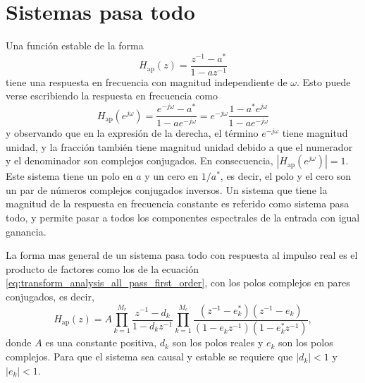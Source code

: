 \documentclass[a4paper]{report}
\begin{document}
\section{Sistemas pasa todo}\label{sec:transform_analysis_all_pass_systems}

Una función estable de la forma
\begin{equation}\label{eq:transform_analysis_all_pass_first_order}
 H_\textrm{ap}(z)=\frac{z^{-1}-a^*}{1-az^{-1}} 
\end{equation}
tiene una respuesta en frecuencia con magnitud independiente de \(\omega\). Esto puede verse escribiendo la respuesta en frecuencia como
\begin{equation}\label{eq:transform_analysis_all_pass_first_order_alt}
 H_\textrm{ap}(e^{j\omega})=\frac{e^{-j\omega}-a^*}{1-ae^{-j\omega}}
  =e^{-j\omega}\frac{1-a^*e^{j\omega}}{1-ae^{-j\omega}} 
\end{equation}
y observando que en la expresión de la derecha, el término \(e^{-j\omega}\) tiene magnitud unidad, y la fracción también tiene magnitud unidad debido a que el numerador y el denominador son complejos conjugados. En consecuencia, \(|H_\textrm{ap}(e^{j\omega})|=1\). Este sistema tiene un polo en \(a\) y un cero en \(1/a^*\), es decir, el polo y el cero son un par de números complejos conjugados inversos. 
Un sistema que tiene la magnitud de la respuesta en frecuencia constante es referido como sistema pasa todo, y permite pasar a todos los componentes espectrales de la entrada con igual ganancia.

La forma mas general de un sistema pasa todo con respuesta al impulso real es el producto de factores como los de la ecuación \ref{eq:transform_analysis_all_pass_first_order}, con los polos complejos en pares conjugados, es decir,
\begin{equation}\label{eq:transform_analysis_all_pass_generic}
 H_\textrm{ap}(z)=A\prod_{k=1}^{M_r}\frac{z^{-1}-d_k}{1-d_kz^{-1}}\prod_{k=1}^{M_c}\frac{(z^{-1}-e_k^*)(z^{-1}-e_k)}{(1-e_kz^{-1})(1-e^*_kz^{-1})}, 
\end{equation}
donde \(A\) es una constante positiva, \(d_k\) son los polos reales y \(e_k\) son los polos complejos. Para que el sistema sea causal y estable se requiere que \(|d_k|<1\) y \(|e_k|<1\).
\end{document}
